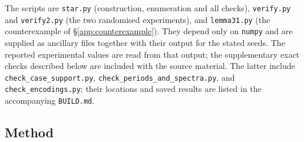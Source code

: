 \documentclass[11pt,reqno]{amsart}
\theoremstyle{plain}
\theoremstyle{definition}
\theoremstyle{remark}
\theoremstyle{plain}
\theoremstyle{remark}
\theoremstyle{definition}
\numberwithin{equation}{section}
\begin{document}
The scripts are \texttt{star.py} (construction, enumeration and all checks),
\texttt{verify.py} and \texttt{verify2.py} (the two randomised experiments),
and \texttt{lemma31.py} (the counterexample of \S\ref{app:counterexample}).
They depend only on \texttt{numpy} and are supplied as ancillary files together
with their output for the stated seeds.  The reported experimental values are
read from that output; the supplementary exact checks described below are
included with the source material.  The latter include
\texttt{check\_case\_support.py}, \texttt{check\_periods\_and\_spectra.py},
and \texttt{check\_encodings.py}; their locations and saved results are listed
in the accompanying \texttt{BUILD.md}.

\subsection{Method}\label{app:method}
\end{document}
